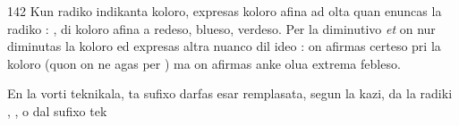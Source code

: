\begin{VUpage}[146]{142}
Kun radiko indikanta koloro,  expresas koloro afina\nl
ad olta quan enuncas la radiko : \nl
{}, di koloro afina a redeso, blueso, verdeso.\nl
Per la diminutivo \textit{et} on nur diminutas la koloro ed expresas\nl
altra nuanco dil ideo : on afirmas certeso pri la koloro\nl
(quon on ne agas per ) ma on afirmas anke olua\nl
extrema febleso.

En la vorti teknikala, ta sufixo darfas esar remplasata,\nl
segun la kazi, da la radiki , , o dal sufixo tek\cc
\end{VUpage}

